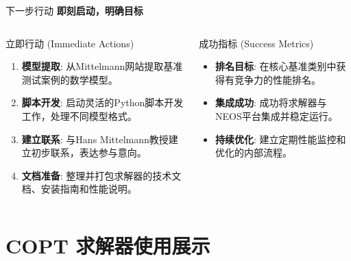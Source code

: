 \documentclass[10pt]{beamer}
\begin{document}
\begin{frame}{下一步行动}
  \textbf{即刻启动，明确目标}
  \begin{columns}[T,onlytextwidth]
      \begin{block}{立即行动 (Immediate Actions)}
        \begin{enumerate}
          \item \textbf{模型提取}: 从Mittelmann网站提取基准测试案例的数学模型。
          \item \textbf{脚本开发}: 启动灵活的Python脚本开发工作，处理不同模型格式。
          \item \textbf{建立联系}: 与Hans Mittelmann教授建立初步联系，表达参与意向。
          \item \textbf{文档准备}: 整理并打包求解器的技术文档、安装指南和性能说明。
        \end{enumerate}
      \end{block}
      \begin{exampleblock}{成功指标 (Success Metrics)}
        \begin{itemize}
          \item \textbf{排名目标}: 在核心基准类别中获得有竞争力的性能排名。
          \item \textbf{集成成功}: 成功将求解器与NEOS平台集成并稳定运行。
          \item \textbf{持续优化}: 建立定期性能监控和优化的内部流程。
        \end{itemize}
      \end{exampleblock}
  \end{columns}
\end{frame}

\section{COPT 求解器使用展示}
\end{document}
